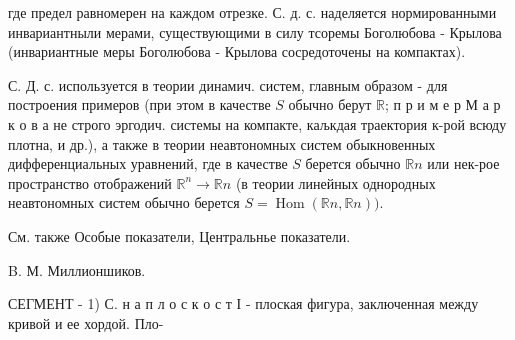 \documentclass[10pt]{article}
\begin{document}
где предел равномерен на каждом отрезке. С. д. с. наделяется нормированными инвариантныли мерами, существующими в силу тсоремы Боголюбова - Крылова (инвариантные меры Боголюбова - Крылова сосредоточены на компактах).



С. Д. с. используется в теории динамич. систем, главным образом - для построения примеров (при этом в качестве $S$ обычно берут $\mathbb{R}$; п р и м е р М а р к о в а не строго эргодич. системы на компакте, каљкдая траектория к-рой всюду плотна, и др.), а также в теории неавтономных систем обыкновенных дифференциальных уравнений, где в качестве $S$ берется обычно $\mathbb{R} n$ или нек-рое пространство отображений $\mathbb{R}^{n} \rightarrow \mathbb{R} n$ (в теории линейных однородных неавтономных систем обычно берется $S=\operatorname{Hom}(\mathbb{R} n, \mathbb{R} n))$.



См. также Особые показатели, Центральнье показатели.



B. М. Миллионшиков.



СЕГМЕНТ - 1) С. н а п л о с к о с т І - плоская фигура, заключенная между кривой и ее хордой. Пло-
\end{document}
